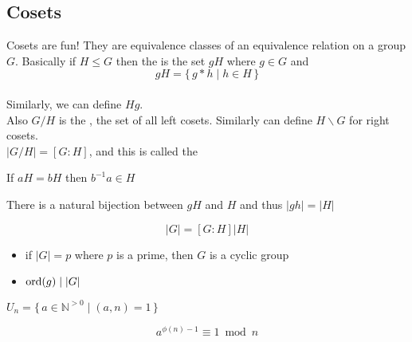 \documentclass[11pt]{scrartcl}
\newcommand\Set[2]{\{\,#1\mid#2\,\}}
\begin{document}
\subsection{Cosets}
\begin{definitions}
  Cosets are fun! They are equivalence classes of an equivalence relation on a group $G$. Basically if $H \leq G$ then the  is the set $gH$ where $g\in G$ and $$gH = \Set{g*h}{h\in H}$$\\
  Similarly, we can define $Hg$.
  \\Also $G/H$ is the , the set of all left cosets. Similarly can define $H  \backslash G$ for right cosets.
  \\
  $\vert G/H \vert = [G:H]$, and this is called the 
\end{definitions}
\begin{prop}
  If $aH=bH$ then $b^{-1}a \in H$
\end{prop}
\begin{prop}
There is a natural bijection between $gH$ and $H$ and thus $\vert gh \vert = \vert H \vert$
\end{prop}
\begin{theorem}
$$\vert G \vert = [G:H]\vert H \vert$$
\end{theorem}
\begin{prop}
\begin{itemize}
Some easy propositions as a consequence of Lagrange's Theorem
    \item if $\vert G \vert =p $ where $p$ is a prime, then $G$ is a cyclic group
    \item $\operatorname{ord}(g) \mid \vert G \vert$
\end{itemize}
\end{prop}
\begin{definitions}
  $U_{n} = \Set{a \in \mathbb{N}^{>0}}{(a,n)=1}$
\end{definitions}
\begin{theorem}
$$a^{\phi(n) -1} \equiv 1 \bmod{n} $$
\end{theorem}
\end{document}

